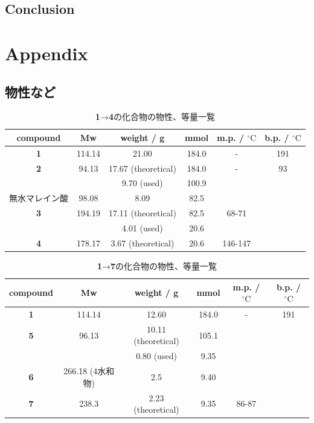 \documentclass{ltjsarticle}
\theoremstyle{definition}
\numberwithin{equation}{section}
\newcommand{\D}{^\circ\text{C}}
\begin{document}
\subsection{Conclusion}
\newpage
\section{Appendix}
\subsection{物性など}
\begin{table}[htp]
\caption{\textbf{1}→\textbf{4}の化合物の物性、等量一覧}
\begin{center}
\begin{tabular}{cccccc}
\toprule
compound & Mw & weight / g & mmol & m.p. / $\D$ & b.p. / $\D$\\
\midrule
\textbf{1} & 114.14 & 21.00 & 184.0 & - & 191\\
\textbf{2} & 94.13 & 17.67 (theoretical) & 184.0 & - & 93\\
  &  & 9.70 (used) & 100.9 & \\
無水マレイン酸 & 98.08 & 8.09  & 82.5 & \\
\textbf{3} & 194.19 & 17.11 (theoretical) & 82.5 & 68-71 & \\
  &  & 4.01 (used) & 20.6 & \\
\textbf{4} & 178.17 & 3.67 (theoretical) & 20.6 & 146-147 & \\
\bottomrule
\end{tabular}
\end{center}
\label{properties_6-1}
\end{table}%

\begin{table}[htp]
\caption{\textbf{1}→\textbf{7}の化合物の物性、等量一覧}
\begin{center}
\begin{tabular}{cccccc}
\toprule
compound & Mw & weight / g & mmol & m.p. / $\D$ & b.p. / $\D$\\
\midrule
\textbf{1} & 114.14 & 12.60 & 184.0 & - & 191\\
\textbf{5} & 96.13 & 10.11 (theoretical) & 105.1 & \\%
  &  & 0.80 (used) & 9.35 & \\
\textbf{6} & 266.18 (4水和物) & 2.5 & 9.40 & & \\
\textbf{7} & 238.3 & 2.23 (theoretical) & 9.35 & 86-87 & \\
\bottomrule
\end{tabular}
\end{center}
\label{properties_6-2}
\end{table}%
 
\end{document}

